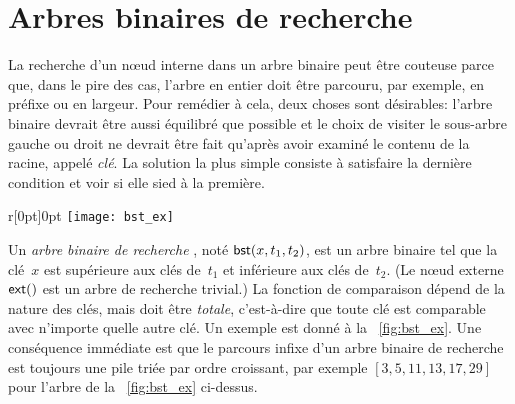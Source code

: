 \chapter{Arbres binaires de recherche}

La recherche d'un nœud interne dans un arbre binaire peut être
couteuse parce que, dans le pire des cas, l'arbre en entier doit être
parcouru, par exemple, en préfixe ou en largeur. Pour remédier à cela,
deux choses sont désirables: l'arbre binaire devrait être aussi
équilibré que possible et le
choix de visiter le sous-arbre gauche ou droit ne devrait être fait
qu'après avoir examiné le contenu de la racine, appelé
\emph{clé}. La solution la plus simple consiste à
satisfaire la dernière condition et voir si elle sied à la première.

\begin{wrapfigure}[7]{r}[0pt]{0pt}
\centering
\texttt{[image: bst\_ex]}
\caption{}
\label{fig:bst_ex}
\end{wrapfigure}
Un \emph{arbre binaire de recherche} \citep{Mahmoud_1992}, noté \(\textsf{bst}(x, t_1,
t_2)\),
est un arbre binaire tel que la clé~\(x\) est supérieure aux clés
de~\(t_1\) et inférieure aux clés de~\(t_2\). (Le nœud externe
\(\textsf{ext}()\) est un arbre de recherche trivial.) La fonction de
comparaison dépend de la nature des clés, mais doit être
\emph{totale}, c'est-à-dire que toute clé est comparable avec
n'importe quelle autre clé. Un exemple est donné à la
\fig~\vref{fig:bst_ex}. Une conséquence immédiate est que le parcours
infixe d'un arbre binaire de
recherche est toujours une pile triée par ordre croissant, par exemple
\([3,5,11,13,17,29]\) pour l'arbre de la \fig~\ref{fig:bst_ex}
ci-dessus.

